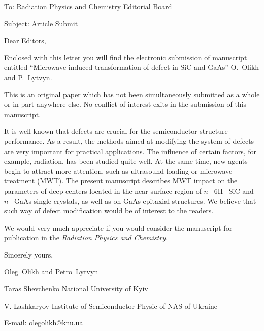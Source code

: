 \documentclass[preprint]{elsarticle}
\begin{document}
To:
Radiation Physics and Chemistry Editorial Board


Subject:
Article Submit

\vspace{5mm}
Dear Editors,

\vspace{3mm}
Enclosed with this letter you will find the electronic submission of manuscript entitled
``Microwave induced transformation of defect in SiC and GaAs'' O.~Olikh  and P.~Lytvyn.



This is an original paper which has not been simultaneously submitted as a whole or in part anywhere else.
No conflict of interest exits in the submission of this manuscript.


It is well known that defects are crucial for the semiconductor structure performance.
As a result, the methods aimed at
modifying the system of defects are very important for practical applications.
The influence of certain factors, for example, radiation, has been studied quite well.
At the same time, new agents begin to attract more attention, such as ultrasound loading 
or microwave treatment (MWT).
The present manuscript describes 
 MWT impact on the parameters of deep centers located in the near surface region of $n$–-6H-–SiC and $n$-–GaAs single crystals,
as well as on  GaAs  epitaxial structures.
We believe that such way of defect modification would be of interest to the readers.

We would  very much appreciate if you would consider the manuscript for publication in the \emph{Radiation Physics and Chemistry}.

\vspace{3mm}

Sincerely yours,

Oleg~Olikh and Petro~Lytvyn


Taras Shevchenko National University of Kyiv

V. Lashkaryov Institute of Semiconductor Physic of NAS of Ukraine


E-mail: olegolikh@knu.ua


\end{document}
